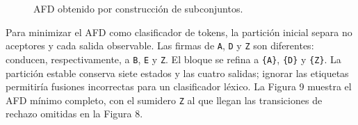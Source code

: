 \documentclass[11pt,letterpaper]{article}
\newcommand{\code}[1]{{\ttfamily\small #1}}
\begin{document}
\begin{figure}[H]
  \centering
  \caption{AFD obtenido por construcción de subconjuntos.}
\end{figure}

Para minimizar el AFD como clasificador de tokens, la partición inicial separa no aceptores y cada salida observable. Las firmas de \texttt{A}, \texttt{D} y \texttt{Z} son diferentes: conducen, respectivamente, a \texttt{B}, \texttt{E} y \texttt{Z}. El bloque se refina a \texttt{\{A\}}, \texttt{\{D\}} y \texttt{\{Z\}}. La partición estable conserva siete estados y las cuatro salidas; ignorar las etiquetas permitiría fusiones incorrectas para un clasificador léxico. La Figura 9 muestra el AFD mínimo completo, con el sumidero \texttt{Z} al que llegan las transiciones de rechazo omitidas en la Figura 8.
\end{document}
